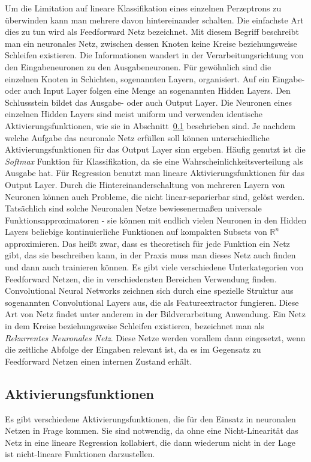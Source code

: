 Um die Limitation auf lineare Klassifikation eines einzelnen Perzeptrons zu überwinden kann man mehrere davon hintereinander schalten. 
Die einfachste Art dies zu tun wird als Feedforward Netz bezeichnet.
Mit diesem Begriff beschreibt man ein neuronales Netz, zwischen dessen Knoten keine Kreise beziehungsweise Schleifen existieren.
Die Informationen wandert in der Verarbeitungsrichtung von den Eingabeneuronen zu den Ausgabeneuronen.
Für gewöhnlich sind die einzelnen Knoten in Schichten, sogenannten Layern, organisiert.
Auf ein Eingabe- oder auch Input Layer folgen eine Menge an sogenannten Hidden Layers.
Den Schlussstein bildet das Ausgabe- oder auch Output Layer.
Die Neuronen eines einzelnen Hidden Layers sind meist uniform und verwenden identische Aktivierungsfunktionen, wie sie in Abschnitt~\ref{sec:activationfuncs} beschrieben sind.
Je nachdem welche Aufgabe das neuronale Netz erfüllen soll können unterschiedliche Aktivierungsfunktionen für das Output Layer sinn ergeben.
Häufig genutzt ist die \textit{Softmax} Funktion für Klassifikation, da sie eine Wahrscheinlichkeitsverteilung als Ausgabe hat.
Für Regression benutzt man lineare Aktivierungsfunktionen für das Output Layer. 
Durch die Hintereinanderschaltung von mehreren Layern von Neuronen können auch Probleme, die nicht linear-separierbar sind, gelöst werden.
Tatsächlich sind solche Neuronalen Netze bewiesenermaßen universale Funktionsapproximatoren - 
sie können mit endlich vielen Neuronen in den Hidden Layers beliebige kontinuierliche Funktionen auf kompakten Subsets von \(\mathbb{R}^n\) approximieren.
Das heißt zwar, dass es theoretisch für jede Funktion ein Netz gibt, das sie beschreiben kann, in der Praxis muss man dieses Netz auch finden und dann auch trainieren können.
Es gibt viele verschiedene Unterkategorien von Feedforward Netzen, die in verschiedensten Bereichen Verwendung finden.
Convolutional Neural Networks zeichnen sich durch eine spezielle Struktur aus sogenannten Convolutional Layers aus, die als Featureextractor fungieren.
Diese Art von Netz findet unter anderem in der Bildverarbeitung Anwendung.
Ein Netz in dem Kreise beziehungsweise Schleifen existieren, bezeichnet man als \textit{Rekurrentes Neuronales Netz}.
Diese Netze werden vorallem dann eingesetzt, wenn die zeitliche Abfolge der Eingaben relevant ist, 
da es im Gegensatz zu Feedforward Netzen einen internen Zustand erhält.

\subsection{Aktivierungsfunktionen}
\label{sec:activationfuncs}
Es gibt verschiedene Aktivierungsfunktionen, die für den Einsatz in neuronalen Netzen in Frage kommen.
Sie sind notwendig, da ohne eine Nicht-Linearität das Netz in eine lineare Regression kollabiert, 
die dann wiederum nicht in der Lage ist nicht-lineare Funktionen darzustellen.

